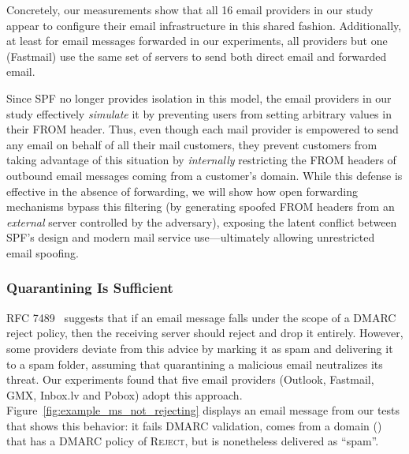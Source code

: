 Concretely, our measurements show that all 16 email providers in our study appear to configure their email infrastructure in this shared fashion.
Additionally, at least for email messages forwarded in our experiments, all providers but one (Fastmail) use the same set of servers to send both direct email and forwarded email.

Since SPF no longer provides isolation in this model, the email
providers in our study effectively \emph{simulate} it by preventing users
from setting arbitrary values in their \textsc{FROM} header.  Thus,
even though each mail provider is empowered to send any email on
behalf of all their mail customers, they prevent customers from taking
advantage of this situation by \emph{internally} restricting the \textsc{FROM} headers of outbound email messages coming from a customer's domain.
While this defense is effective in the absence of forwarding, we will
show how open forwarding mechanisms bypass this filtering (by generating spoofed \textsc{FROM} headers from an \emph{external} server controlled by the adversary),
exposing the latent conflict between SPF's design and modern mail service
use---ultimately allowing unrestricted email spoofing.



\subsubsection{Quarantining Is Sufficient}
\label{subsubsec:quarantine_instead_of_reject}
RFC 7489~\cite{rfc5231} suggests that if an email message falls under the scope of a DMARC reject policy, then the receiving server should reject and drop it entirely. However, some providers deviate from this advice by marking it as spam and delivering it to a spam folder, assuming that quarantining a malicious email neutralizes its threat.
Our experiments found that five email providers (Outlook, Fastmail, GMX, Inbox.lv and Pobox) adopt this approach.
Figure~\ref{fig:example_ms_not_rejecting} displays an email message from our tests that shows this behavior: it fails DMARC validation, comes from a domain () that has a DMARC policy of \textsc{Reject}, but is nonetheless delivered
as ``spam''.

